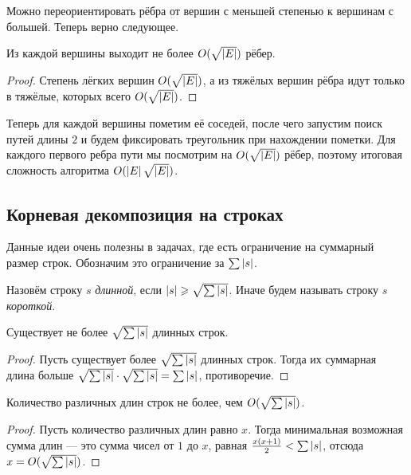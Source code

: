 Можно переориентировать рёбра от вершин с меньшей степенью к вершинам с большей. Теперь верно следующее.

\begin{lemma}
    Из каждой вершины выходит не более $O(\sqrt{\left\lvert E\right\rvert})$ рёбер.
\end{lemma}

\begin{proof}
    Степень лёгких вершин $O(\sqrt{\left\lvert E\right\rvert})$, а из тяжёлых вершин рёбра идут только в тяжёлые, которых всего $O(\sqrt{\left\lvert E\right\rvert})$.
\end{proof}

Теперь для каждой вершины пометим её соседей, после чего запустим поиск путей длины $2$ и будем фиксировать треугольник при нахождении пометки. Для каждого первого ребра пути мы посмотрим на $O(\sqrt{\left\lvert E\right\rvert})$ рёбер, поэтому итоговая сложность алгоритма $O(\left\lvert E\right\rvert\sqrt{\left\lvert E\right\rvert})$.

\subsection{Корневая декомпозиция на строках}

Данные идеи очень полезны в задачах, где есть ограничение на суммарный размер строк. Обозначим это ограничение за $\sum\limits\left\lvert s\right\rvert$.

\begin{definition}
    Назовём строку $s$ \textit{длинной}, если $\left\lvert s\right\rvert \geqslant \sqrt{\sum\left\lvert s\right\rvert}$. Иначе будем называть строку $s$ \textit{короткой}.
\end{definition}

\begin{lemma}
    Существует не более $\sqrt{\sum\left\lvert s\right\rvert}$ длинных строк.
\end{lemma}

\begin{proof}
    Пусть существует более $\sqrt{\sum\left\lvert s\right\rvert}$ длинных строк. Тогда их суммарная длина больше $\sqrt{\sum\left\lvert s\right\rvert} \cdot \sqrt{\sum\left\lvert s\right\rvert} = \sum\left\lvert s\right\rvert$, противоречие.
\end{proof}

\begin{lemma}
    Количество различных длин строк не более, чем $O(\sqrt{\sum\left\lvert s\right\rvert})$.
\end{lemma}

\begin{proof}
    Пусть количество различных длин равно $x$. Тогда минимальная возможная сумма длин --- это сумма чисел от $1$ до $x$, равная $\frac{x(x + 1)}{2} < \sum\left\lvert s\right\rvert$, отсюда $x = O(\sqrt{\sum\left\lvert s\right\rvert})$.
\end{proof}

